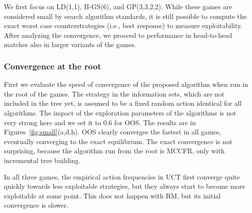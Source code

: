 \documentclass{aamas2015}
\begin{document}
We first focus on LD(1,1), II-GS(6), and GP(3,3,2,2). While these games are considered small by search algorithm standards, it is still possible to compute the exact worst case counterstrategies (i.e., best response) to measure exploitability. After analyzing the convergence, we proceed to performance in head-to-head matches also in larger variants of the games.

\subsubsection{Convergence at the root}

First we evaluate the speed of convergence of the proposed algorithm when run in the root of the games. The strategy in the information sets, which are not included in the tree yet, is assumed to be a fixed random action identical for all algorithms. The impact of the exploration parameters of the algorithms is not very strong here and we set it to $0.6$ for OOS. The results are in Figures~\ref{fig:small}(a,d,h). OOS clearly converges the fastest in all games, eventually converging to the exact equilibrium. The exact convergence is not surprising, because the algorithm run from the root is MCCFR, only with incremental tree building.

In all three games, the empirical action frequencies in UCT first converge quite quickly towards less exploitable strategies, but they always start to become more exploitable at some point. This does not happen with RM, but its initial convergence is slower.
\end{document}
